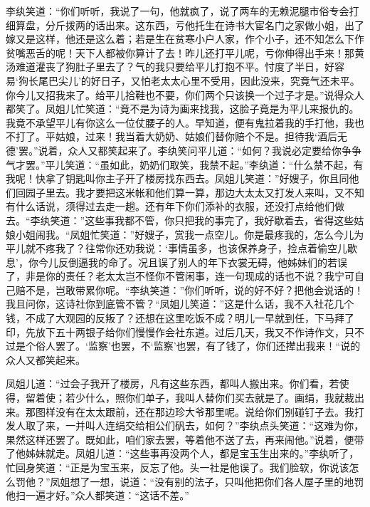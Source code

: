 \documentclass[12pt,oneside]{book}
\begin{document}
李纨笑道：“你们听听，我说了一句，他就疯了，说了两车的无赖泥腿市俗专会打细算盘，分斤拨两的话出来。这东西，亏他托生在诗书大宦名门之家做小姐，出了嫁又是这样，他还是这么着；若是生在贫寒小户人家，作个小子，还不知怎么下作贫嘴恶舌的呢！天下人都被你算计了去！昨儿还打平儿呢，亏你伸得出手来！那黄汤难道灌丧了狗肚子里去了？气的我只要给平儿打抱不平。忖度了半日，好容易‘狗长尾巴尖儿’的好日子，又怕老太太心里不受用，因此没来，究竟气还未平。你今儿又招我来了。给平儿拾鞋也不要，你们两个只该换一个过子才是。”说得众人都笑了。凤姐儿忙笑道：“竟不是为诗为画来找我，这脸子竟是为平儿来报仇的。我竟不承望平儿有你这么一位仗腰子的人。早知道，便有鬼拉着我的手打他，我也不打了。平姑娘，过来！我当着大奶奶、姑娘们替你赔个不是。担待我‘酒后无德’罢。”说着，众人又都笑起来了。李纨笑问平儿道：“如何？我说必定要给你争争气才罢。”平儿笑道：“虽如此，奶奶们取笑，我禁不起。”李纨道：“什么禁不起，有我呢！快拿了钥匙叫你主子开了楼房找东西去。凤姐儿笑道：”好嫂子，你且同他们回园子里去。我才要把这米帐和他们算一算，那边大太太又打发人来叫，又不知有什么话说，须得过去走一趟。还有年下你们添补的衣服，还没打点给他们做去。“李纨笑道：”这些事我都不管，你只把我的事完了，我好歇着去，省得这些姑娘小姐闹我。“凤姐忙笑道：”好嫂子，赏我一点空儿。你是最疼我的，怎么今儿为平儿就不疼我了？往常你还劝我说：‘事情虽多，也该保养身子，捡点着偷空儿歇息’，你今儿反倒逼我的命了。况且误了别人的年下衣裳无碍，他姊妹们的若误了，非是你的责任？老太太岂不怪你不管闲事，连一句现成的话也不说？我宁可自己赔不是，岂敢带累你呢。“李纨笑道：”你们听听，说的好不好？把他会说话的！我且问你，这诗社你到底管不管？“凤姐儿笑道：”这是什么话，我不入社花几个钱，不成了大观园的反叛了？还想在这里吃饭不成？明儿一早就到任，下马拜了印，先放下五十两银子给你们慢慢作会社东道。过后几天，我又不作诗作文，只不过是个俗人罢了。‘监察’也罢，不‘监察’也罢，有了钱了，你们还撵出我来！“说的众人又都笑起来。

凤姐儿道：“过会子我开了楼房，凡有这些东西，都叫人搬出来。你们看，若使得，留着使；若少什么，照你们单子，我叫人替你们买去就是了。画绢，我就裁出来。那图样没有在太太跟前，还在那边珍大爷那里呢。说给你们别碰钉子去。我打发人取了来，一并叫人连绢交给相公们矾去，如何？”李纨点头笑道：“这难为你，果然这样还罢了。既如此，咱们家去罢，等着他不送了去，再来闹他。”说着，便带了他姊妹就走。凤姐儿道：“这些事再没两个人，都是宝玉生出来的。”李纨听了，忙回身笑道：“正是为宝玉来，反忘了他。头一社是他误了。我们脸软，你说该怎么罚他？”凤姐想了一想，说道：“没有别的法子，只叫他把你们各人屋子里的地罚他扫一遍才好。”众人都笑道：“这话不差。”
\end{document}
